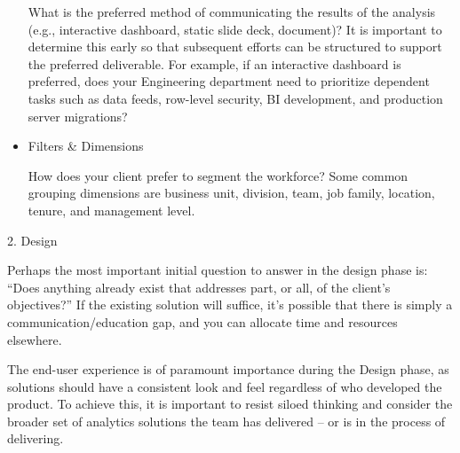 \documentclass[]{book}
\begin{document}
\begin{itemize}
  What is the preferred method of communicating the results of the analysis (e.g., interactive dashboard, static slide deck, document)? It is important to determine this early so that subsequent efforts can be structured to support the preferred deliverable. For example, if an interactive dashboard is preferred, does your Engineering department need to prioritize dependent tasks such as data feeds, row-level security, BI development, and production server migrations?
\item
  Filters \& Dimensions

  How does your client prefer to segment the workforce? Some common grouping dimensions are business unit, division, team, job family, location, tenure, and management level.
\end{itemize}

2. Design

Perhaps the most important initial question to answer in the design phase is: ``Does anything already exist that addresses part, or all, of the client's objectives?'' If the existing solution will suffice, it's possible that there is simply a communication/education gap, and you can allocate time and resources elsewhere.

The end-user experience is of paramount importance during the Design phase, as solutions should have a consistent look and feel regardless of who developed the product. To achieve this, it is important to resist siloed thinking and consider the broader set of analytics solutions the team has delivered -- or is in the process of delivering.
\end{document}
